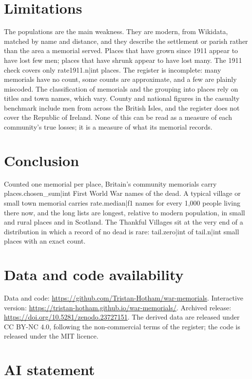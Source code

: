 \documentclass[11pt,a4paper]{article}
\begin{document}
\section{Limitations}

The populations are the main weakness. They are modern, from Wikidata, matched by name and distance, and they describe the settlement or parish rather than the area a memorial served. Places that have grown since 1911 appear to have lost few men; places that have shrunk appear to have lost many. The 1911 check covers only {{rate1911.n|int}} places. The register is incomplete: many memorials have no count, some counts are approximate, and a few are plainly miscoded. The classification of memorials and the grouping into places rely on titles and town names, which vary. County and national figures in the casualty benchmark include men from across the British Isles, and the register does not cover the Republic of Ireland. None of this can be read as a measure of each community's true losses; it is a measure of what its memorial records.

\section{Conclusion}

Counted one memorial per place, Britain's community memorials carry {{places.chosen_sum|int}} First World War names of the dead. A typical village or small town memorial carries {{rate.median|f1}} names for every 1,000 people living there now, and the long lists are longest, relative to modern population, in small and rural places and in Scotland. The Thankful Villages sit at the very end of a distribution in which a record of no dead is rare: {{tail.zero|int}} of {{tail.n|int}} small places with an exact count.

\section*{Data and code availability}

Data and code: \url{https://github.com/Tristan-Hotham/war-memorials}. Interactive version: \url{https://tristan-hotham.github.io/war-memorials/}. Archived release: \url{https://doi.org/10.5281/zenodo.23727151}. The derived data are released under CC BY-NC 4.0, following the non-commercial terms of the register; the code is released under the MIT licence.

\section*{AI statement}
\end{document}
